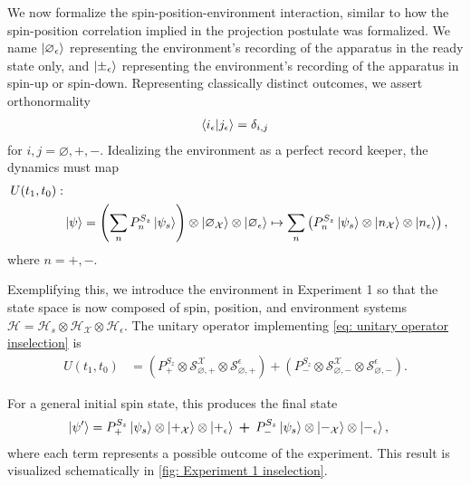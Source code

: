 We now formalize the spin-position-environment interaction, similar to how the spin-position correlation implied in the projection postulate was formalized. We name $\ket{\varnothing_\epsilon}$ representing the environment's recording of the apparatus in the ready state only, and $\ket{\pm_\epsilon}$ representing the environment's recording of the apparatus in spin-up or spin-down. Representing classically distinct outcomes, we assert orthonormality
\begin{align}
  \braket{i_\epsilon | j_\epsilon} = \delta_{i,j}
\end{align}
for $i,j = \varnothing, +, -$.
Idealizing the environment as a perfect record keeper, the dynamics must map
\begin{align} \label{eq: unitary operator inselection}
    \nonumber U(t_1, t_0): \\
    & \ket{\psi} = \left(\sum_{n} P^{S_z}_n\ket{\psi_s}\right) \otimes \ket{\varnothing_\mathcal{X}} \otimes \ket{\varnothing_\epsilon} \mapsto \sum_{n}\left(P^{S_z}_n\ket{\psi_s} \otimes \ket{n_\mathcal{X}} \otimes \ket{n_\epsilon} \right),
\end{align}
where $n= +,-$.

Exemplifying this, we introduce the environment in Experiment 1 so that the state space is now composed of spin, position, and environment systems $\mathcal{H} = \mathcal{H}_s \otimes \mathcal{H}_\mathcal{X} \otimes \mathcal{H}_\epsilon$. The unitary operator implementing \autoref{eq: unitary operator inselection} is
\begin{align} \label{einselection experiment 1}
  U(t_1, t_0) &= \left(P^{S_z}_+ \otimes \mathcal{S}^\mathcal{X}_{\varnothing, +} \otimes \mathcal{S}^\epsilon_{\varnothing, +} \right) + \left(P^{S_z}_- \otimes \mathcal{S}^\mathcal{X}_{\varnothing, -} \otimes \mathcal{S}^\epsilon_{\varnothing, -} \right).
\end{align}

For a general initial spin state, this produces the final state
\begin{align} \label{einselection experiment 1 state}
  \ket{\psi'} &= P^{S_z}_+ \ket{\psi_s} \otimes \ket{+_{\mathcal{X}}} \otimes \ket{+_\epsilon} \: \bm{+} \: P^{S_z}_- \ket{\psi_s} \otimes \ket{-_{\mathcal{X}}} \otimes \ket{-_\epsilon},
\end{align}
where each term represents a possible outcome of the experiment. This result is visualized schematically in \autoref{fig: Experiment 1 inselection}.

